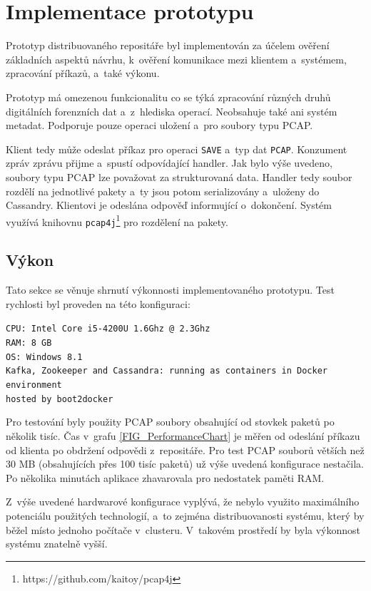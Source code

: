 \chapter{Implementace prototypu} \label{chapterPrototype}
Prototyp distribuovaného repositáře byl implementován za účelem ověření základních aspektů návrhu, k~ověření komunikace mezi klientem a~systémem, zpracování příkazů, a~také výkonu.

Prototyp má omezenou funkcionalitu co se týká zpracování různých druhů digitálních forenzních dat a~z~hlediska operací. Neobsahuje také ani systém metadat. Podporuje pouze operaci uložení a~pro soubory typu PCAP.

Klient tedy může odeslat příkaz pro operaci \texttt{SAVE} a~typ dat \texttt{PCAP}. Konzument zpráv zprávu přijme a~spustí odpovídající handler. Jak bylo výše uvedeno, soubory typu PCAP lze považovat za strukturovaná data. Handler tedy soubor rozdělí na jednotlivé pakety a~ty jsou potom serializovány a~uloženy do Cassandry. Klientovi je odeslána odpověď informující o~dokončení. Systém využívá knihovnu \texttt{pcap4j}\footnote{https://github.com/kaitoy/pcap4j} pro rozdělení na pakety.

\section{Výkon}
Tato sekce se věnuje shrnutí výkonnosti implementovaného prototypu. Test rychlosti byl proveden na této konfiguraci:

\vspace{0.5cm}
\noindent
\texttt{CPU: Intel Core i5-4200U 1.6Ghz @ 2.3Ghz} \\
\texttt{RAM: 8 GB} \\
\texttt{OS: Windows 8.1} \\
\texttt{Kafka, Zookeeper and Cassandra: running as containers in Docker environment} \\
\texttt{hosted by boot2docker}

\vspace{0.5cm}
\noindent
Pro testování byly použity PCAP soubory obsahující od stovkek paketů po několik tisíc. Čas v~grafu \ref{FIG_PerformanceChart} je měřen od odeslání příkazu od klienta po obdržení odpovědi z~repositáře. Pro test PCAP souborů větších než 30 MB (obsahujících přes 100 tisíc paketů) už výše uvedená konfigurace nestačila. Po několika minutách aplikace zhavarovala pro nedostatek paměti RAM.

Z~výše uvedené hardwarové konfigurace vyplývá, že nebylo využito maximálního potenciálu použitých technologií, a~to zejména distribuovanosti systému, který by běžel místo jednoho počítače v~clusteru. V~takovém prostředí by byla výkonnost systému znatelně vyšší.

